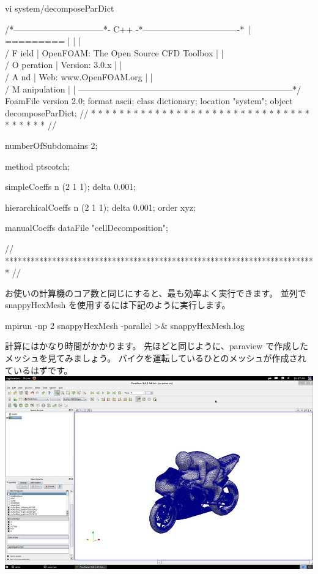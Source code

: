 \documentclass[mingoth,a4paper]{jsarticle}
\begin{document}
\begin{commandline}
vi system/decomposeParDict

/*--------------------------------*- C++ -*----------------------------------*\
| =========                 |                                                 |
| \\      /  F ield         | OpenFOAM: The Open Source CFD Toolbox           |
|  \\    /   O peration     | Version:  3.0.x                                 |
|   \\  /    A nd           | Web:      www.OpenFOAM.org                      |
|    \\/     M anipulation  |                                                 |
\*---------------------------------------------------------------------------*/
FoamFile
{
    version     2.0;
    format      ascii;
    class       dictionary;
    location    "system";
    object      decomposeParDict;
}
// * * * * * * * * * * * * * * * * * * * * * * * * * * * * * * * * * * * * * //

numberOfSubdomains 2;

method          ptscotch;

simpleCoeffs
{
    n               (2 1 1);
    delta           0.001;
}

hierarchicalCoeffs
{
    n               (2 1 1);
    delta           0.001;
    order           xyz;
}

manualCoeffs
{
    dataFile        "cellDecomposition";
}


// ************************************************************************* //
\end{commandline}

お使いの計算機のコア数と同じにすると、最も効率よく実行できます。
並列で snappyHexMesh を使用するには下記のように実行します。

\begin{commandline}
mpirun -np 2 snappyHexMesh -parallel >& snappyHexMesh.log
\end{commandline}

計算にはかなり時間がかかります。
先ほどと同じように、paraview で作成したメッシュを見てみましょう。
バイクを運転しているひとのメッシュが作成されているはずです。\\
\includegraphics[scale=0.5]{image201604/motorbike_mesh.jpg}
\end{document}
